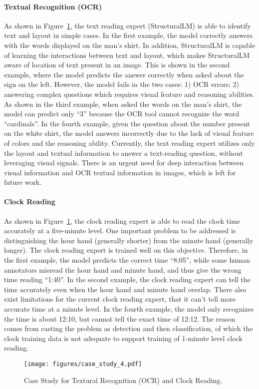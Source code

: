 \paragraph{Textual Recognition (OCR)}
As shown in Figure~\ref{fig:case_study_3}, the text reading expert (StructuralLM) is able to identify text and layout in simple cases. In the first example, the model correctly answers with the words displayed on the man's shirt. In addition, StructuralLM is capable of learning the interactions between text and layout, which makes StructuralLM aware of location of text present in an image. This is shown in the second example, where the model predicts the answer correctly when asked about the sign on the left. However, the model fails in the two cases: 1) OCR errors; 2) answering complex questions which requires visual feature and reasoning abilities. As shown in the third example, when asked the words on the man's shirt, the model can predict only ``3'' because the OCR tool cannot recognize the word ``cardinals''. In the fourth example, given the question about the number present on the white shirt, the model answers incorrectly due to the lack of visual feature of colors and the reasoning ability. Currently, the text reading expert utilizes only the layout and textual information to answer a text-reading question, without leveraging visual signals. There is an urgent need for deep interaction between visual information and OCR textual information in images, which is left for future work.

\paragraph{Clock Reading}
As shown in Figure~\ref{fig:case_study_3}, the clock reading expert is able to read the clock time accurately at a five-minute level. One important problem to be addressed is distinguishing the hour hand (generally shorter) from the minute hand (generally longer). The clock reading expert is trained well on this objective. Therefore, in the first example, the model predicts the correct time ``8:05'', while some human annotators misread the hour hand and minute hand, and thus give the wrong time reading ``1:40''. In the second example, the clock reading expert can tell the time accurately even when the hour hand and minute hand overlap. There also exist limitations for the current clock reading expert, that it can't tell more accurate time at a minute level. In the fourth example, the model only recognizes the time is about 12:10, but cannot tell the exact time of 12:12. The reason comes from casting the problem as detection and then classification, of which the clock training data is not adequate to support training of 1-minute level clock reading.

\begin{figure}[t] \centering
    \texttt{[image: figures/case\_study\_4.pdf]}
    \caption{Case Study for Textural Recognition (OCR) and Clock Reading.}
    \label{fig:case_study_3}
\end{figure}

